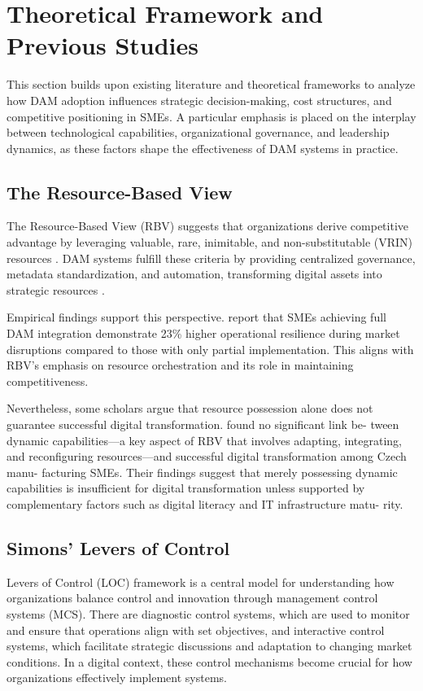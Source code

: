 \documentclass[a4paper,12pt,twocolumn]{article}
\begin{document}
\justifying
\fussy

\section{Theoretical Framework and Previous Studies}
This section builds upon existing literature and theoretical frameworks to analyze how DAM adoption influences 
strategic decision-making, cost structures, and competitive positioning in SMEs. A particular emphasis is placed 
on the interplay between technological capabilities, organizational governance, and leadership dynamics,
as these factors shape the effectiveness of DAM systems in practice.


\subsection{The Resource-Based View}
The Resource-Based View (RBV) suggests that organizations derive competitive advantage by leveraging valuable, rare, inimitable, 
and non-substitutable (VRIN) resources \cite{barney1991}. DAM systems fulfill these criteria by providing centralized governance,
metadata standardization, and automation, transforming digital assets into strategic resources \cite{Chumphong2020}.

\vspace{0.3cm}
Empirical findings support this perspective. \cite{Chumphong2020} report that SMEs achieving full DAM integration 
demonstrate 23\% higher operational resilience during market disruptions compared to those with only partial implementation. 
This aligns with RBV’s emphasis on resource orchestration and its role in maintaining competitiveness.

\vspace{0.3cm}
Nevertheless, some scholars argue that
resource possession alone does not guarantee successful 
digital transformation. 
\cite{Civelek2023} found no significant link be-
tween dynamic capabilities—a key aspect
of RBV that involves adapting, integrating,
and reconfiguring resources—and successful
digital transformation among Czech manu-
facturing SMEs. Their findings suggest that
merely possessing dynamic capabilities is
insufficient for digital transformation unless
supported by complementary factors such as
digital literacy and IT infrastructure matu-
rity.

\subsection{Simons’ Levers of Control}
\cite{simons1995} Levers of Control (LOC) framework is a central model for understanding how organizations 
balance control and innovation through management control systems (MCS). 
There are diagnostic control systems, which are used to monitor and ensure that operations 
align with set objectives, and interactive control systems, which facilitate strategic discussions and adaptation to 
changing market conditions. In a digital context, these control mechanisms become crucial for how organizations effectively 
implement systems.
\end{document}
